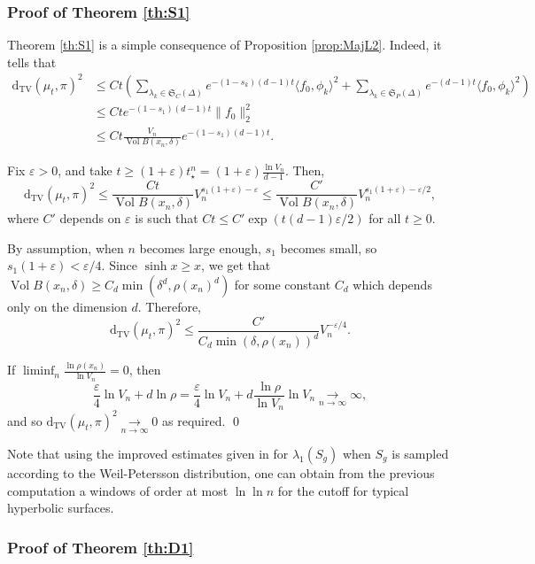 \documentclass[]{scrartcl}
\newcommand{\DTV}{\mathrm{d_{TV}}}
\newcommand\limit[2]{\overset{#1}{\underset{#2}{\longrightarrow}}}
\newcommand\limitninf[1]{\limit{#1}{n \to \infty}}
\DeclareMathOperator{\Vol}{Vol}
\numberwithin{equation}{section}
\numberwithin{figure}{section}
\begin{document}
\subsubsection{Proof of Theorem  \ref{th:S1}}

Theorem \ref{th:S1} is a simple consequence of Proposition \ref{prop:MajL2}. Indeed, it tells that
\begin{align*}\DTV\left( \mu_t,\pi \right)^2 &\leq C t \left(\sum_{\lambda_k \in \mathfrak S_C(\Delta)} e^{-(1-s_k) (d-1) t}\langle f_0, \phi_k \rangle^2 + \sum_{\lambda_k \in \mathfrak S_P(\Delta)} e^{-(d-1)t}\langle f_0, \phi_k \rangle^2\right)
	\\&\leq C t  e^{ -(1-s_{1}) (d-1) t} \lVert f_0\rVert_2^2
	\\& \leq  C t \frac{V_n}{\Vol B ( x_n, \delta)}  e^{ - (1-s_{1}) (d-1) t}.
\end{align*}

Fix $\varepsilon > 0$, and take $t \geq \left(1+\varepsilon \right)t^n_\star = \left(1+\varepsilon \right) \frac{\ln V_n}{d-1}$. Then, \[\DTV\left( \mu_t,\pi \right)^2 \leq {\frac{C t }{\Vol B ( x_n , \delta)}}V_n^{s_{1}(1+\varepsilon)-\varepsilon} \leq  {\frac{C' }{\Vol B ( x_n , \delta)}}V_n^{s_{1}(1+\varepsilon)-\varepsilon/2} ,\]
where $C'$ depends on $\varepsilon$ is such that $ C t \leq C' \exp( t (d-1) \varepsilon / 2)$ for all $t\geq 0$. 

By assumption, when $n$ becomes large enough, $s_{1}$ becomes small, so $s_{1}(1+\varepsilon) < \varepsilon / 4$. Since $\sinh x \geq x$, we get that $\Vol B ( x_n , \delta ) \geq C_d \min(\delta^d, \rho(x_n)^d)$ for some constant $C_d$ which depends only on the dimension $d$.  Therefore, \[\DTV\left( \mu_t,\pi \right)^2 \leq {\frac{C' }{ C_d \min(\delta,\rho(x_n))^d}}{V_n^{-\varepsilon/4}}.\]

If $\liminf_n \frac{\ln  \rho(x_n)}{\ln V_n} = 0$, then \[\frac{\varepsilon}{4} \ln V_n + d\ln \rho = \frac{\varepsilon}{4} \ln V_n + d \frac{\ln \rho}{\ln V_n} \ln V_n \limitninf{}{} \infty,\] and so $\DTV\left( \mu_t,\pi \right)^2 \limitninf{}{} 0$ as required. 	  \qed 

Note that using the improved estimates given in \cite{HideMaceraThomas} for $\lambda_1(S_g)$ when $S_g$ is sampled according to the Weil-Petersson distribution, one can obtain from the previous computation a windows of order at most $\ln \ln n$ for the cutoff for typical hyperbolic surfaces.

\subsubsection{Proof of Theorem \ref{th:D1}}
\end{document}
